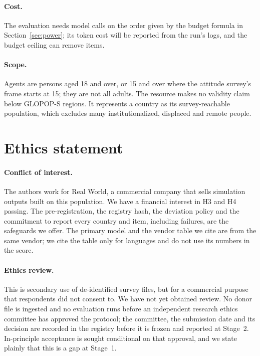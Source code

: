\documentclass[10pt]{article}
\begin{document}
\paragraph{Cost.} The evaluation needs model calls on the order given by the budget formula in Section~\ref{sec:power}; its token cost will be reported from the run's logs, and the budget ceiling can remove items.

\paragraph{Scope.} Agents are persons aged 18 and over, or 15 and over where the attitude survey's frame starts at 15; they are not all adults. The resource makes no validity claim below GLOPOP-S regions. It represents a country as its survey-reachable population, which excludes many institutionalized, displaced and remote people.

\section{Ethics statement}

\paragraph{Conflict of interest.} The authors work for Real World, a commercial company that sells simulation outputs built on this population. We have a financial interest in H3 and H4 passing. The pre-registration, the registry hash, the deviation policy and the commitment to report every country and item, including failures, are the safeguards we offer. The primary model and the vendor table we cite \citep{anthropicmultilingual,claudemodels} are from the same vendor; we cite the table only for languages and do not use its numbers in the score.

\paragraph{Ethics review.} This is secondary use of de-identified survey files, but for a commercial purpose that respondents did not consent to. We have not yet obtained review. No donor file is ingested and no evaluation runs before an independent research ethics committee has approved the protocol; the committee, the submission date and its decision are recorded in the registry before it is frozen and reported at Stage~2. In-principle acceptance is sought conditional on that approval, and we state plainly that this is a gap at Stage~1.
\end{document}
